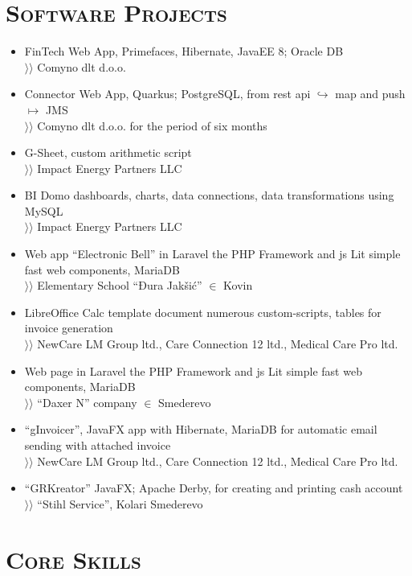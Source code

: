 \documentclass{article}
\begin{document}
\section{\textsc{Software Projects}}

\begin{itemize}[parsep=1.5pt]
\item  FinTech Web App, Primefaces, Hibernate, JavaEE 8; Oracle DB\\
$\rangle\!\rangle$ Comyno dlt d.o.o.
\item Connector Web App, Quarkus; PostgreSQL, from rest api $\hookrightarrow$ map and push $\mapsto$ JMS\\
$\rangle\!\rangle$ Comyno dlt d.o.o. for the period of six months
\item G-Sheet, custom arithmetic script\\
$\rangle\!\rangle$ Impact Energy Partners LLC
\item BI Domo dashboards, charts, data connections, data transformations using MySQL\\
$\rangle\!\rangle$ Impact Energy Partners LLC
\item Web app ``Electronic Bell'' in Laravel the PHP Framework and js Lit simple fast web components, MariaDB\\
$\rangle\!\rangle$ Elementary School ``Đura Jakšić'' $\in$ Kovin
\item LibreOffice Calc template document numerous custom-scripts, tables for invoice generation\\ 
$\rangle\!\rangle$ NewCare LM Group ltd., Care Connection 12 ltd., Medical Care Pro ltd.
\item Web page in Laravel the PHP Framework and js Lit simple fast web components, MariaDB\\
$\rangle\!\rangle$ ``Daxer N'' company $\in$ Smederevo
\item ``gInvoicer'', JavaFX app with Hibernate, MariaDB for automatic email sending with attached invoice\\
$\rangle\!\rangle$ NewCare LM Group ltd., Care Connection 12 ltd., Medical Care Pro ltd.
\item ``GRKreator'' JavaFX; Apache Derby, for creating and printing cash account\\
$\rangle\!\rangle$ ``Stihl Service'', Kolari Smederevo
\end{itemize}

\section{\textsc{Core Skills}}
\end{document}
